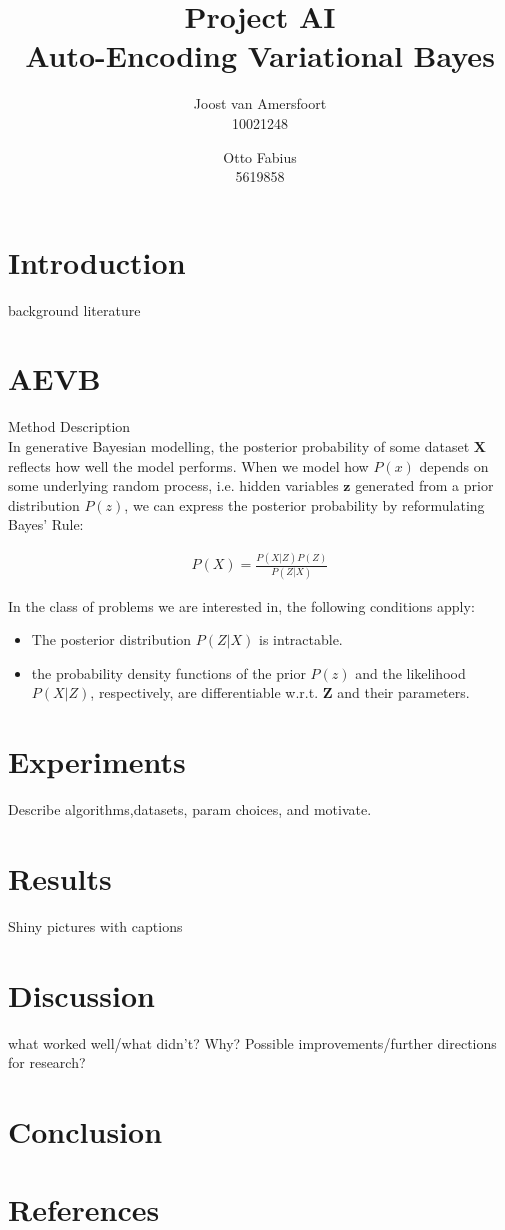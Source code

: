 \documentclass{article}
\begin{document}
\title{Project AI \\ Auto-Encoding Variational Bayes}
\author{	
	Joost van Amersfoort \\ 10021248  
	\and
	Otto Fabius \\ 5619858
	}
\maketitle

\section*{Introduction}
background literature \\ 



\section*{AEVB}
Method Description \\

In generative Bayesian modelling, the posterior probability of some dataset $\mathbf{X}$ reflects how well the model performs. When we model how $P(x)$ depends on some underlying random process, i.e. hidden variables $\mathbf{z}$ generated from a prior distribution $P(z)$, we can express the posterior probability by reformulating Bayes' Rule:

\begin{align*}
P(X) = \frac{P(X|Z)P(Z)}{P(Z|X)}
\end{align*}

In the class of problems we are interested in, the following conditions apply:
\begin{itemize}
\item The posterior distribution $P(Z|X)$ is intractable. 
\item the probability density functions of the prior $P(z)$ and the likelihood $P(X|Z)$, respectively, are differentiable w.r.t. $\mathbf{Z}$ and their parameters. 
\end{itemize}



\section*{Experiments}

Describe algorithms,datasets, param choices, and motivate.

\section*{Results}

Shiny pictures with captions

\section*{Discussion}

what worked well/what didn't? Why? Possible improvements/further directions for research?

\section*{Conclusion}



\section*{References}
\end{document}

